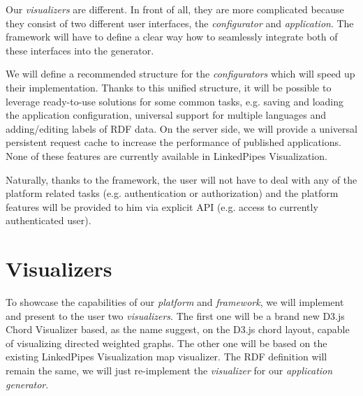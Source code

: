 Our \emph{visualizers} are different. In front of all, they are more complicated because they consist of two different user interfaces, the \emph{configurator} and \emph{application}. The framework will have to define a clear way how to seamlessly integrate both of these interfaces into the generator.

We will define a recommended structure for the \emph{configurators} which will speed up their implementation. Thanks to this unified structure, it will be possible to leverage ready-to-use solutions for some common tasks, e.g. saving and loading the application configuration, universal support for multiple languages and adding/editing labels of RDF data. On the server side, we will provide a universal persistent request cache to increase the performance of published applications. None of these features are currently available in LinkedPipes Visualization.

Naturally, thanks to the framework, the user will not have to deal with any of the platform related tasks (e.g. authentication or authorization) and the platform features will be provided to him via explicit API (e.g. access to currently authenticated user).

\section{Visualizers}

To showcase the capabilities of our \emph{platform} and \emph{framework}, we will implement and present to the user two \emph{visualizers}. The first one will be a brand new D3.js Chord Visualizer based, as the name suggest, on the D3.js chord layout, capable of visualizing directed weighted graphs. The other one will be based on the existing LinkedPipes Visualization map visualizer. The RDF definition will remain the same, we will just re-implement the \emph{visualizer} for our \emph{application generator}.

	